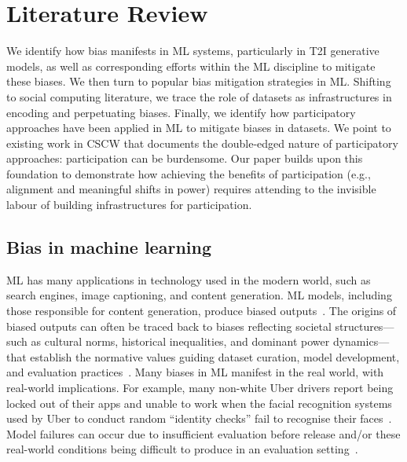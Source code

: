 \section{{Literature Review}}
\label{sec:lit-review}
We identify how bias manifests in ML systems, particularly in T2I generative models, as well as corresponding efforts within the ML discipline to mitigate these biases. We then turn to popular bias mitigation strategies in ML. Shifting to social computing literature, we trace the role of datasets as infrastructures in encoding and perpetuating biases. Finally, we identify how participatory approaches have been applied in ML to mitigate biases in datasets. We point to existing work in CSCW that documents the double-edged nature of participatory approaches: participation can be burdensome.  Our paper builds upon this foundation to demonstrate how achieving the benefits of participation (e.g., alignment and meaningful shifts in power) requires attending to the invisible labour of building infrastructures for participation.

\subsection{Bias in machine learning}
ML has many applications in technology used in the modern world, such as search engines, image captioning, and content generation. ML models, including those responsible for content generation, produce biased outputs~\cite{agarwal2021evaluating_bias,berg2022prompt_bias, luccioni2024stable_bias, caliskan2017semantics_bias, hovy2016social_bias}. The origins of biased outputs can often be traced back to biases reflecting societal structures—such as cultural norms, historical inequalities, and dominant power dynamics—that establish the normative values guiding dataset curation, model development, and evaluation practices~\cite{Blodgett2021_bias, caliskan2017semantics_bias, birhane2021misogyny, hall2024visogender_bias, WinogenderRudinger2018_bias}.
Many biases in ML manifest in the real world, with real-world implications. For example, many non-white Uber drivers report being locked out of their apps and unable to work when the facial recognition systems used by Uber to conduct random ``identity checks'' fail to recognise their faces~\cite{watkins2023face}. Model failures can occur due to insufficient evaluation before release and/or these real-world conditions being difficult to produce in an evaluation setting~\cite{dev2021genderexclusiveharms_bias,birhaneAIAuditingBroken2024,dengUnderstandingPracticesChallenges2023}.  


